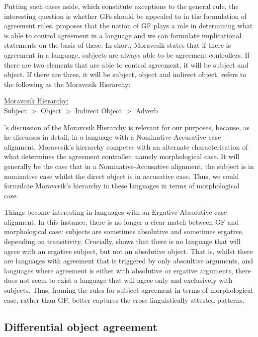 \documentclass[output=paper
,modfonts
,nonflat]{langsci/langscibook}
\begin{document}
\noindent Putting such cases aside, which constitute exceptions to the general rule, the interesting question is whether GFs should be appealed to in the formulation of agreement rules. 
\citet{Moravcsik1974,moravcsik1978} proposes that the notion of GF plays a role in determining what is able to control agreement in a language and we can formulate implicational statements on the basis of these. 
In short, Moravcsik states that if there is agreement in a language, subjects are always able to be agreement controllers.
If there are two elements that are able to control agreement, it will be subject and object. 
If there are three, it will be subject, object and indirect object. 
\citet{Bobaljik2008} refers to the following as the Moravcsik Hierarchy:

\begin{exe}
\ex
\underline{Moravcsik Hierarchy:}\\
Subject $>$ Object $>$ Indirect Object $>$ Adverb
\end{exe}

\noindent \citeauthor{Bobaljik2008}'s discussion of the Moravcsik Hierarchy is relevant for our purposes, because, as he discusses in detail, in a language with a Nominative-Accusative case alignment, Moravcsik's hierarchy competes with an alternate characterisation of what determines the agreement controller, namely morphological case. 
It will generally be the case that in a Nominative-Accusative alignment, the subject is in nominative case whilst the direct object is in accusative case. 
Thus, we could formulate Moravcsik's hierarchy in these languages in terms of morphological case.

Things become interesting in languages with an Ergative-Absolutive case alignment. In this instance, there is no longer a clear match between GF and morphological case: subjects are sometimes absolutive and sometimes ergative, depending on transitivity. Crucially, \citeauthor{Bobaljik2008} shows that there is no language that will agree with an ergative subject, but not an absolutive object.
That is, whilst there are languages with agreement that is triggered by only absoultive arguments, and languages where agreement is either with absolutive or ergative arguments, there does not seem to exist a language that will agree only and exclusively with subjects.
Thus, framing the rules for subject agreement in terms of morphological case, rather than GF, better captures the cross-linguistically attested patterns. 

\subsection{Differential object agreement}
\end{document}
